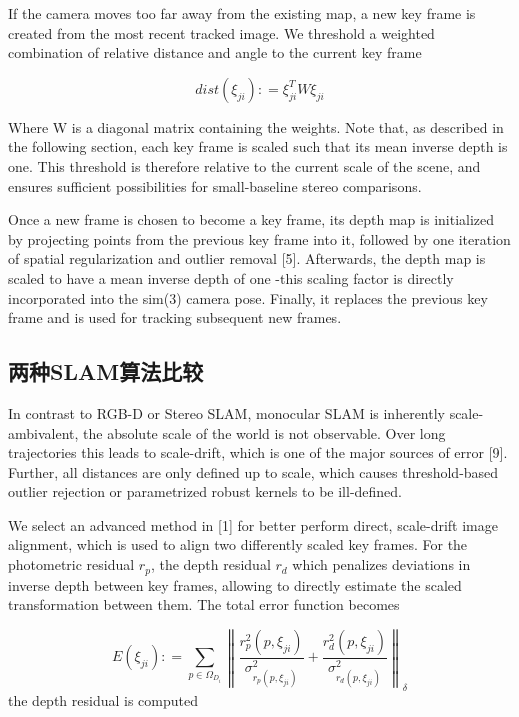 If the camera moves too far away from the existing map, a new key frame is created from the most recent tracked image. We threshold a weighted combination of relative distance and angle to the current key frame

\begin{equation}
dist({\xi _{ji}}): = \xi _{ji}^TW{\xi _{ji}}
\end{equation}

Where W is a diagonal matrix containing the weights. Note that, as described in the following section, each key frame is scaled such that its mean inverse depth is one. This threshold is therefore relative to the current scale of the scene, and ensures sufficient possibilities for small-baseline stereo comparisons.

Once a new frame is chosen to become a key frame, its depth map is initialized by projecting points from the previous key frame into it, followed by one iteration of spatial regularization and outlier removal [5]. Afterwards, the depth map is scaled to have a mean inverse depth of one -this scaling factor is directly incorporated into the sim(3) camera pose. Finally, it replaces the previous key frame and is used for tracking subsequent new frames.



\subsection{两种SLAM算法比较}


In contrast to RGB-D or Stereo SLAM, monocular SLAM is inherently scale-ambivalent, the absolute scale of the world is not observable. Over long trajectories this leads to scale-drift, which is one of the major sources of error [9]. Further, all distances are only defined up to scale, which causes threshold-based outlier rejection or parametrized robust kernels to be ill-defined.

We select an advanced method in [1] for better perform direct, scale-drift image alignment, which is used to align two differently scaled key frames. For the photometric residual ${r_p}$, the depth residual ${r_d}$ which penalizes deviations in inverse depth between key frames, allowing to directly estimate the scaled transformation between them. The total error function becomes

\begin{equation}
E({\xi _{ji}}): = {\sum\limits_{p \in {\Omega _{{D_i}}}} {\left\| {\frac{{r_p^2(p,{\xi _{ji}})}}{{\sigma _{{r_p}(p,{\xi _{ji}})}^2}} + \frac{{r_d^2(p,{\xi _{ji}})}}{{\sigma _{{r_d}(p,{\xi _{ji}})}^2}}} \right\|} _\delta }
\end{equation}
the depth residual is computed

